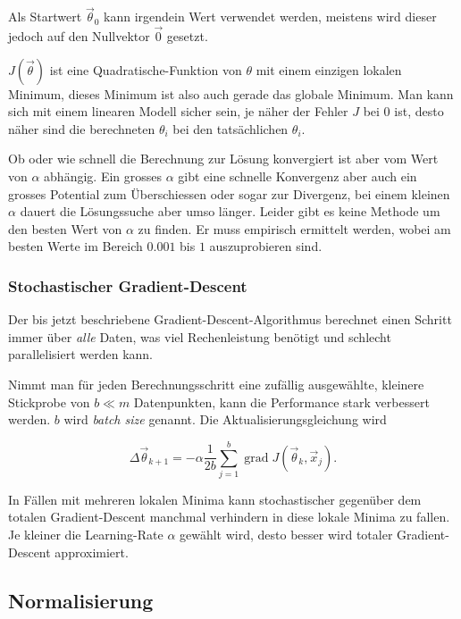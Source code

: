 Als Startwert $\vec\theta_0$ kann irgendein Wert verwendet werden, meistens wird dieser jedoch
auf den Nullvektor $\vec 0$ gesetzt.

$J(\vec \theta)$ ist eine Quadratische-Funktion von $\theta$ mit einem einzigen lokalen
Minimum, %
dieses Minimum ist also auch gerade das globale Minimum. Man kann sich mit einem linearen
Modell sicher sein, je näher der Fehler $J$ bei $0$ ist, desto näher sind die berechneten
$\theta_i$ bei den tatsächlichen $\theta_i$.

Ob oder wie schnell die Berechnung zur Lösung konvergiert ist aber vom Wert von $\alpha$
abhängig. Ein grosses $\alpha$ gibt eine schnelle Konvergenz aber auch ein grosses
Potential zum Überschiessen oder sogar zur Divergenz, bei einem kleinen $\alpha$ dauert
die Lösungssuche aber umso länger. Leider gibt es keine Methode um den besten Wert von
$\alpha$ zu finden. Er muss empirisch ermittelt werden, wobei am besten Werte im
Bereich $0.001$ bis $1$ auszuprobieren sind. \cite[S. 51]{ml:introduction-to-ml}

\subsubsection{Stochastischer Gradient-Descent}

Der bis jetzt beschriebene Gradient-Descent-Algorithmus berechnet einen Schritt immer über
\emph{alle} Daten, was viel Rechenleistung benötigt und schlecht parallelisiert werden
kann.

Nimmt man für jeden Berechnungsschritt eine zufällig ausgewählte, kleinere Stickprobe von
$b \ll m$ Datenpunkten, kann die Performance stark verbessert werden. $b$ wird
\emph{batch size} genannt. Die Aktualisierungsgleichung  wird

\begin{equation}
  \Delta \vec\theta_{k+1} = - \alpha \frac{1}{2b} \sum_{j=1}^{b} \operatorname{grad} J(\vec
  \theta_k, \vec x_j).
\end{equation}

In Fällen mit mehreren lokalen Minima kann stochastischer gegenüber dem totalen Gradient-Descent manchmal
verhindern in diese lokale Minima zu fallen. Je kleiner die Learning-Rate $\alpha$ gewählt
wird, desto besser wird totaler Gradient-Descent approximiert. 
\cite[S. 93ff]{ml:ml-tom-mitchell}

\subsection{Normalisierung}

